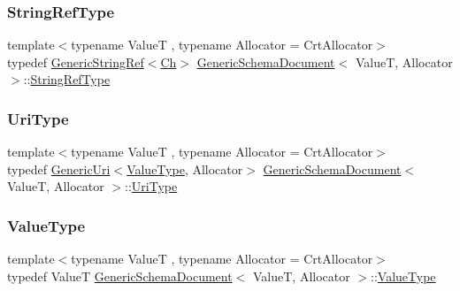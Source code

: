 \mbox{\label{classGenericSchemaDocument_adc77ed1f500a224582385ff730de1aa3}} 
\subsubsection{\texorpdfstring{String\+Ref\+Type}{StringRefType}}
{\footnotesize\ttfamily template$<$typename ValueT , typename Allocator  = Crt\+Allocator$>$ \\
typedef \hyperlink{structGenericStringRef}{Generic\+String\+Ref}$<$\hyperlink{classGenericSchemaDocument_ab1dec56a78b29649eb8e4b85b101ec7c}{Ch}$>$ \hyperlink{classGenericSchemaDocument}{Generic\+Schema\+Document}$<$ ValueT, Allocator $>$\+::\hyperlink{classGenericSchemaDocument_adc77ed1f500a224582385ff730de1aa3}{String\+Ref\+Type}}

\mbox{\label{classGenericSchemaDocument_afcfefaab7eecec6849d478557392e23c}} 
\subsubsection{\texorpdfstring{Uri\+Type}{UriType}}
{\footnotesize\ttfamily template$<$typename ValueT , typename Allocator  = Crt\+Allocator$>$ \\
typedef \hyperlink{classGenericUri}{Generic\+Uri}$<$\hyperlink{classGenericSchemaDocument_ae246f1b6573a5a8a2c0d73d4eb64d53a}{Value\+Type}, Allocator$>$ \hyperlink{classGenericSchemaDocument}{Generic\+Schema\+Document}$<$ ValueT, Allocator $>$\+::\hyperlink{classGenericSchemaDocument_afcfefaab7eecec6849d478557392e23c}{Uri\+Type}}

\mbox{\label{classGenericSchemaDocument_ae246f1b6573a5a8a2c0d73d4eb64d53a}} 
\subsubsection{\texorpdfstring{Value\+Type}{ValueType}}
{\footnotesize\ttfamily template$<$typename ValueT , typename Allocator  = Crt\+Allocator$>$ \\
typedef ValueT \hyperlink{classGenericSchemaDocument}{Generic\+Schema\+Document}$<$ ValueT, Allocator $>$\+::\hyperlink{classGenericSchemaDocument_ae246f1b6573a5a8a2c0d73d4eb64d53a}{Value\+Type}}




